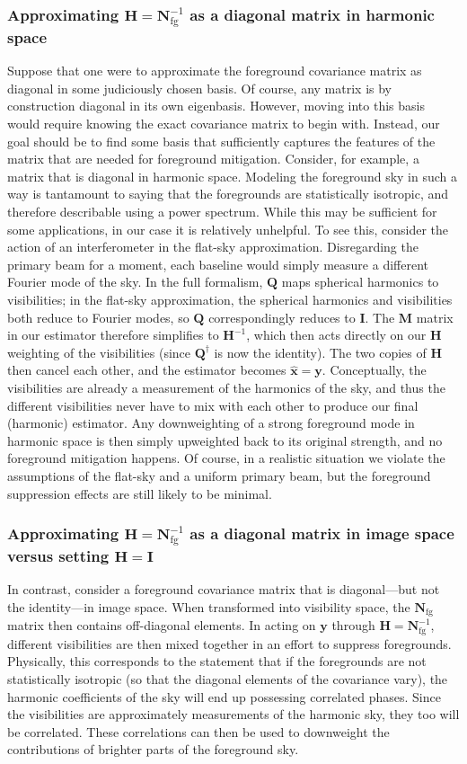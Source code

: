 \documentclass[twocolumn,apj,numberedappendix]{emulateapj}
\newcommand{\xhat}{\hat{\mathbf{x}}}
\newcommand{\y}{\mathbf{y}}
\newcommand{\Hmat}{\mathbf{H}}
\newcommand{\Nfg}{\mathbf{N}_{\textrm{fg}}}
\newcommand{\Q}{\mathbf{Q}}
\newcommand{\M}{\mathbf{M}}
\begin{document}
\subsubsection{Approximating $\Hmat  = \Nfg^{-1}$ as a diagonal matrix in harmonic space}
Suppose that one were to approximate the foreground covariance matrix as diagonal in some judiciously chosen basis. Of course, any matrix is by construction diagonal in its own eigenbasis. However, moving into this basis would require knowing the exact covariance matrix to begin with. Instead, our goal should be to find some basis that sufficiently captures the features of the matrix that are needed for foreground mitigation. Consider, for example, a matrix that is diagonal in harmonic space. Modeling the foreground sky in such a way is tantamount to saying that the foregrounds are statistically isotropic, and therefore describable using a power spectrum. While this may be sufficient for some applications, in our case it is relatively unhelpful. To see this, consider the action of an interferometer in the flat-sky approximation.  Disregarding the primary beam for a moment, each baseline would simply measure a different Fourier mode of the sky. In the full formalism, $\Q$ maps spherical harmonics to visibilities; in the flat-sky approximation, the spherical harmonics and visibilities both reduce to Fourier modes, so $\Q$ correspondingly reduces to $\mathbf{I}$. The $\M$ matrix in our estimator therefore simplifies to $\Hmat^{-1}$, which then acts directly on our $\Hmat$ weighting of the visibilities (since $\Q^\dagger$ is now the identity). The two copies of $\Hmat$ then cancel each other, and the estimator becomes $\xhat = \y$. Conceptually, the visibilities are already a measurement of the harmonics of the sky, and thus the different visibilities never have to mix with each other to produce our final (harmonic) estimator. Any downweighting of a strong foreground mode in harmonic space is then simply upweighted back to its original strength, and no foreground mitigation happens. Of course, in a realistic situation we violate the assumptions of the flat-sky and a uniform primary beam, but the foreground suppression effects are still likely to be minimal.

\subsubsection{Approximating $\Hmat  = \Nfg^{-1}$ as a diagonal matrix in image space versus setting $\Hmat  = \mathbf{I}$}
In contrast, consider a foreground covariance matrix that is diagonal---but not the identity---in image space. When transformed into visibility space, the $\Nfg$ matrix then contains off-diagonal elements. In acting on $\y$ through $\Hmat = \Nfg^{-1}$, different visibilities are then mixed together in an effort to suppress foregrounds. Physically, this corresponds to the statement that if the foregrounds are not statistically isotropic (so that the diagonal elements of the covariance vary), the harmonic coefficients of the sky will end up possessing correlated phases. Since the visibilities are approximately measurements of the harmonic sky, they too will be correlated. These correlations can then be used to downweight the contributions of brighter parts of the foreground sky.
\end{document}
